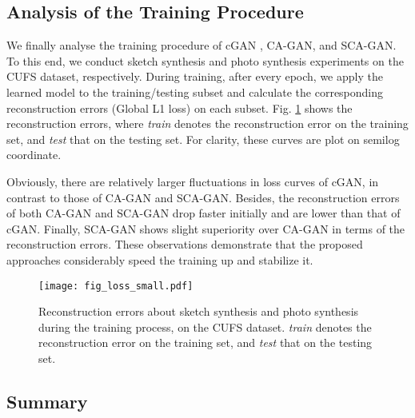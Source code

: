 \documentclass[journal]{IEEEtran}
\begin{document}
\subsection{Analysis of the Training Procedure}
\label{sec:loss}

We finally analyse the training procedure of cGAN \cite{Isola2017Pix2Pix}, CA-GAN, and SCA-GAN. To this end, we conduct sketch synthesis and photo synthesis experiments on the CUFS dataset, respectively.
During training, after every epoch, we apply the learned model to the training/testing subset and calculate the corresponding reconstruction errors (Global L1 loss) on each subset.
Fig. \ref{fig:loss} shows the reconstruction errors, where \textit{train} denotes the reconstruction error on the training set, and \textit{test} that on the testing set. For clarity, these curves are plot on semilog coordinate. 

Obviously, there are relatively larger fluctuations in loss curves of cGAN, in contrast to those of CA-GAN and SCA-GAN. Besides, the reconstruction errors of both CA-GAN and SCA-GAN drop faster initially and are lower than that of cGAN. Finally, SCA-GAN shows slight superiority over CA-GAN in terms of the reconstruction errors. These observations demonstrate that the proposed approaches considerably speed the training up and stabilize it. 


\begin{figure}
\centering
\texttt{[image: fig\_loss\_small.pdf]}
\vspace{-0.8cm}
\caption{Reconstruction errors about sketch synthesis and photo synthesis during the training process, on the CUFS dataset. \textit{train} denotes the reconstruction error on the training set, and \textit{test} that on the testing set.}
\label{fig:loss}
\vspace{-0.6cm}
\end{figure}





\subsection{Summary}
\label{ssec:summary}
\end{document}
